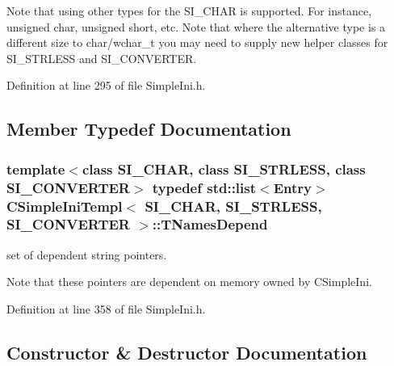 Note that using other types for the S\+I\+\_\+\+C\+H\+AR is supported. For instance, unsigned char, unsigned short, etc. Note that where the alternative type is a different size to char/wchar\+\_\+t you may need to supply new helper classes for S\+I\+\_\+\+S\+T\+R\+L\+E\+SS and S\+I\+\_\+\+C\+O\+N\+V\+E\+R\+T\+ER. 

Definition at line 295 of file Simple\+Ini.\+h.



\subsection{Member Typedef Documentation}
\subsubsection[{\texorpdfstring{T\+Names\+Depend}{TNamesDepend}}]{\setlength{\rightskip}{0pt plus 5cm}template$<$class S\+I\+\_\+\+C\+H\+AR, class S\+I\+\_\+\+S\+T\+R\+L\+E\+SS, class S\+I\+\_\+\+C\+O\+N\+V\+E\+R\+T\+ER$>$ typedef std\+::list$<${\bf Entry}$>$ {\bf C\+Simple\+Ini\+Templ}$<$ S\+I\+\_\+\+C\+H\+AR, S\+I\+\_\+\+S\+T\+R\+L\+E\+SS, S\+I\+\_\+\+C\+O\+N\+V\+E\+R\+T\+ER $>$\+::{\bf T\+Names\+Depend}}\hypertarget{class_c_simple_ini_templ_a391b3f3751e06cd9e9de4fb16ac14342}{}\label{class_c_simple_ini_templ_a391b3f3751e06cd9e9de4fb16ac14342}


set of dependent string pointers. 

Note that these pointers are dependent on memory owned by C\+Simple\+Ini. 

Definition at line 358 of file Simple\+Ini.\+h.



\subsection{Constructor \& Destructor Documentation}
